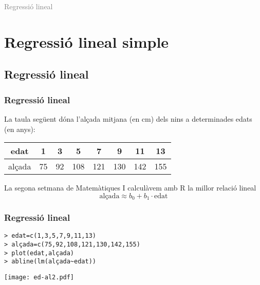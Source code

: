 \documentclass[12pt,t]{beamer}
\title[\red{Matemàtiques II}]{}
\author[]{}
\date{}
\newcommand{\gray}[1]{\textcolor{gray}{#1}}
\theoremstyle{plain}
\theoremstyle{definition}
\begin{document}
\beamertemplatedotitem

\lstset{breaklines=true}
\lstset{basicstyle=\ttfamily}


\begin{frame}
\vfill
\begin{center}
\gray{\LARGE Regressió lineal}
\end{center}
\vfill
\end{frame}



\section{Regressió lineal simple}
\subsection{Regressió lineal}

\begin{frame}
\frametitle{Regressió lineal}

La taula següent dóna l'alçada mitjana (en cm) dels nins a determinades edats (en anys):
\begin{center}
\begin{tabular}{c|ccccccc}
\hline
edat & 1 & 3 & 5 & 7 & 9 & 11 & 13\\
\hline
alçada & 75 & 92 & 108 & 121 & 130 & 142 & 155\\
\hline
\end{tabular}
\end{center}
La segona setmana de Matemàtiques I calculàvem amb R la millor relació lineal
$$
\mbox{alçada}\approx b_0+b_1\cdot\mbox{edat}
$$ 
\end{frame}



\begin{frame}[fragile]
\frametitle{Regressió lineal}
\vspace*{-2ex}

\begin{verbatim}
> edat=c(1,3,5,7,9,11,13)
> alçada=c(75,92,108,121,130,142,155)
> plot(edat,alçada)
> abline(lm(alçada~edat))
\end{verbatim}
\vspace*{-4ex}

\begin{center}
\texttt{[image: ed-al2.pdf]}
\end{center}
\end{frame}
\end{document}

